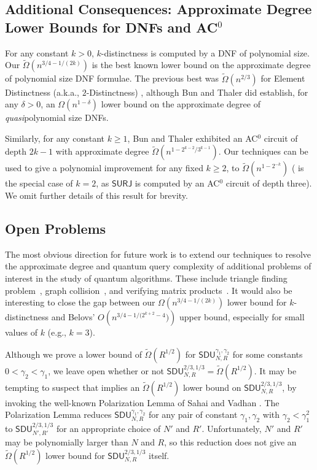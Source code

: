 \documentclass[11pt, letterpaper, fleqn]{article}
\theoremstyle{plain}
\newcommand{\SURJ}{\mathsf{ SURJ}}
\newcommand{\SDU}{\mathsf{ SDU}}
\begin{document}
\subsection{Additional Consequences: Approximate Degree Lower Bounds for DNFs and \texorpdfstring{AC$^0$}{AC0}}
For any constant $k > 0$, $k$-distinctness is computed by a DNF of polynomial size.
Our $\tilde{\Omega}\left(n^{3/4-1/(2k)}\right)$ is the best known lower bound on
the approximate degree of polynomial size DNF formulae. The previous best was $\tilde{\Omega}(n^{2/3})$ for Element Distinctness (a.k.a., $2$-Distinctness) \cite{aaronsonshi}, although Bun and Thaler did establish, for any $\delta>0$, an $\Omega(n^{1-\delta})$ lower bound on the approximate degree of \emph{quasi}polynomial size DNFs.

Similarly, for any constant $k\geq 1$, Bun and Thaler exhibited an AC$^0$ circuit of depth $2k-1$
with approximate degree $\tilde{\Omega}\left(n^{1-2^{k-2}/3^{k-1}}\right)$. 
Our techniques can be used to give a polynomial improvement for any fixed $k\geq 2$, to
$\tilde{\Omega}\left(n^{1-2^{-k}}\right)$ ( 
is the special case of $k=2$, as $\SURJ$ is computed by an AC$^0$ 
circuit of depth three). We omit further details of this result for brevity. 

\subsection{Open Problems}
The most obvious direction for future work is to extend our techniques
to resolve the approximate degree and quantum query complexity of additional
problems of interest in the study of quantum algorithms. These include
triangle finding problem~\cite{triangles3,triangles5}, graph collision~\cite{triangles3}, and verifying matrix products~\cite{robin3,robin2}.
It would also be interesting to close the gap between our $\Omega(n^{3/4-1/(2k)})$
lower bound for $k$-distinctness and Belovs' 
$O\left(n^{3/4-1/(2^{k+2} - 4})\right)$ upper bound, especially for small values of $k$ (e.g., $k=3$).

 Although we prove a lower bound of $\tilde{\Omega}(R^{1/2})$
for $\SDU^{\gamma_1, \gamma_2}_{N, R}$ for some constants $0 < \gamma_2 < \gamma_1$, we leave open whether or not $\SDU^{2/3, 1/3}_{N, R} = \tilde{\Omega}(R^{1/2})$.
It may be tempting to suspect that  implies
an $\tilde{\Omega}(R^{1/2})$ lower bound on $\SDU_{N, R}^{2/3, 1/3}$,
by invoking the well-known Polarization Lemma of Sahai and Vadhan \cite{sahaivadhan}. The Polarization Lemma 
reduces $\SDU^{\gamma_1, \gamma_2}_{N, R}$ for any pair of constant $\gamma_1, \gamma_2$
with $\gamma_2 < \gamma_1^2$ to  $\SDU^{2/3, 1/3}_{N', R'}$ for an appropriate choice of $N'$ and $R'$. Unfortunately, $N'$ and $R'$
may be polynomially larger than $N$ and $R$, so this reduction does not give an $\tilde{\Omega}(R^{1/2})$ lower bound for $\SDU^{2/3, 1/3}_{N, R}$ itself.
\end{document}
